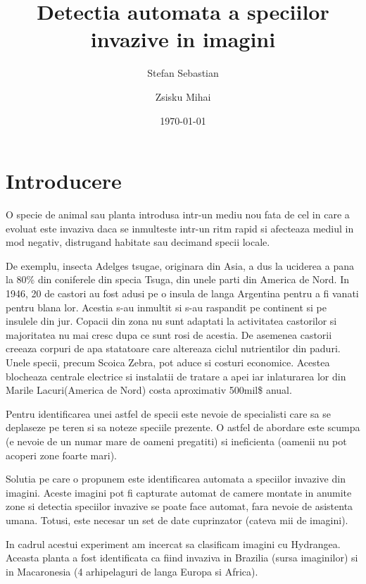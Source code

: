 \documentclass{article}
\begin{document}
\title{Detectia automata a speciilor invazive in imagini}
\author{Stefan Sebastian \and Zsisku Mihai}
\date{\today}
\maketitle

\pagebreak

\section{Introducere}
O specie de animal sau planta introdusa intr-un mediu nou fata de cel in care a evoluat este invaziva daca se inmulteste intr-un ritm rapid si afecteaza mediul in mod negativ, distrugand habitate sau decimand specii locale\cite{WEBSITE:1}.
 
De exemplu, insecta Adelges tsugae, originara din Asia, a dus la uciderea a pana la 80\% din coniferele din specia Tsuga, din unele parti din America de Nord\cite{WEBSITE:2}. In 1946, 20 de castori au fost adusi pe o insula de langa Argentina pentru a fi vanati pentru blana lor. Acestia s-au inmultit si s-au raspandit pe continent si pe insulele din jur. Copacii din zona nu sunt adaptati la activitatea castorilor si majoritatea nu mai cresc dupa ce sunt rosi de acestia. De asemenea castorii creeaza corpuri de apa statatoare care altereaza ciclul nutrientilor din paduri\cite{WEBSITE:3}. Unele specii, precum Scoica Zebra, pot aduce si costuri economice. Acestea blocheaza centrale electrice si instalatii de tratare a apei iar inlaturarea lor din Marile Lacuri(America de Nord) costa aproximativ 500mil\$ anual\cite{WEBSITE:5}.

Pentru identificarea unei astfel de specii este nevoie de specialisti care sa se deplaseze pe teren si sa noteze speciile prezente. O astfel de abordare este scumpa (e nevoie de un numar mare de oameni pregatiti) si ineficienta (oamenii nu pot acoperi zone foarte mari).

Solutia pe care o propunem este identificarea automata a speciilor invazive din imagini. Aceste imagini pot fi capturate automat de camere montate in anumite zone si detectia speciilor invazive se poate face automat, fara nevoie de asistenta umana. Totusi, este necesar un set de date cuprinzator (cateva mii de imagini).

In cadrul acestui experiment am incercat sa clasificam imagini cu Hydrangea. Aceasta planta a fost identificata ca fiind invaziva in Brazilia (sursa imaginilor) si in Macaronesia (4 arhipelaguri de langa Europa si Africa)\cite{BOOK:1}.
\end{document}

